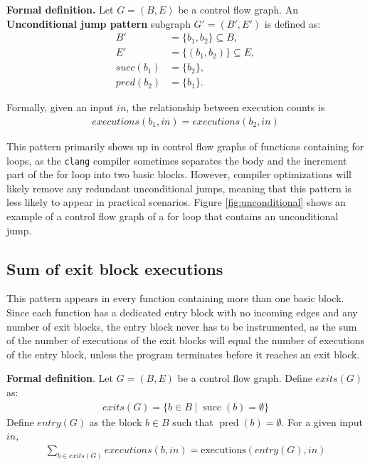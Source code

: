 \textbf{Formal definition.} Let \( G = (B, E) \) be a control flow graph. An \textbf{Unconditional jump pattern} subgraph \( G' = (B', E') \) is defined as:
\begin{align}
    B' &= \{b_1, b_2\} \subseteq B, \\
    E' &= \{(b_1, b_2)\} \subseteq E, \\
    succ(b_1) &= \{b_2\}, \\
    pred(b_2) &= \{b_1\}.
\end{align}

\medskip
Formally, given an input \(in\), the relationship between execution counts is
\begin{align}
executions(b_1, in) = executions(b_2, in)
\end{align}

This pattern primarily shows up in control flow graphs of functions containing for loops, as the \verb|clang| compiler sometimes separates the body and the increment part of the for loop into two basic blocks. However, compiler optimizations will likely remove any redundant unconditional jumps, meaning that this pattern is less likely to appear in practical scenarios. Figure \ref{fig:unconditional} shows an example of a control flow graph of a for loop that contains an unconditional jump.



\medskip\noindent
\subsection{Sum of exit block executions}

This pattern appears in every function containing more than one basic block. Since each function has a dedicated entry block with no incoming edges and any number of exit blocks, the entry block never has to be instrumented, as the sum of the number of executions of the exit blocks will equal the number of executions of the entry block, unless the program terminates before it reaches an exit block. 

\textbf{Formal definition}. Let \( G = (B, E) \) be a control flow graph. Define \(exits(G)\) as:
\begin{align}
exits(G) = \{ b \in B \mid \operatorname{succ}(b) = \emptyset \}
\end{align}
Define \(entry(G)\) as the block \( b\in B \) such that \(\operatorname{pred}(b) = \emptyset\). For a given input \(in\),
\begin{align}
\sum_{b \in exits(G)} executions(b, in) = \text{executions}(entry(G), in)
\end{align}


